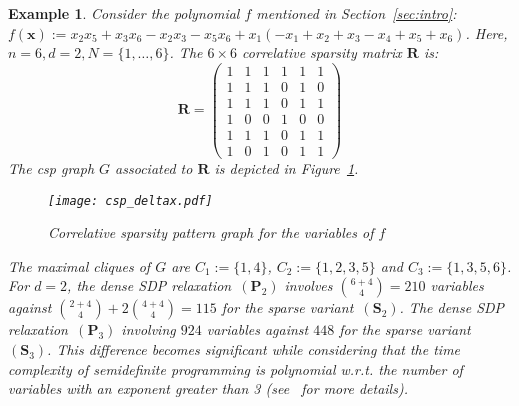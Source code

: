 \documentclass[preprint]{sigplanconf}
\newcommand{\x}{\mathbf{x}}
\def\P{\mathbf{P}}
\def\S{\mathbf{S}}
\def\S{\mathbf{S}}
\theoremstyle{plain}
\newtheorem{example}{Example}
\begin{document}
\begin{example}
\label{ex:sparse}
Consider the polynomial $f$ mentioned in Section~\ref{sec:intro}:
$f(\x) := x_2 x_5 + x_3 x_6 - x_2 x_3  - x_5 x_6 
+ x_1 ( - x_1 +  x_2 +  x_3  - x_4 +  x_5 +  x_6)$.
%
Here, $n = 6, d = 2, N = \{1,\dots, 6 \}$. The $6 \times 6$ correlative sparsity matrix $\mathbf{R}$ is:
\[
\mathbf{R} = 
\begin{pmatrix}
  1 & 1 & 1 & 1 & 1 & 1 \\
  1 & 1 & 1 & 0 & 1 & 0 \\
  1 & 1 & 1 & 0 & 1 & 1 \\
  1 & 0 & 0 & 1 & 0 & 0 \\
  1 & 1 & 1 & 0 & 1 & 1 \\
  1 & 0 & 1 & 0 & 1 & 1 
 \end{pmatrix}
\]
The csp graph $G$ associated to $\mathbf{R}$ is depicted in Figure~\ref{fig:csp_deltax}. 
%
\begin{figure}[!ht]	
\begin{center}
\texttt{[image: csp\_deltax.pdf]}
\caption{Correlative sparsity pattern graph for the variables of $f$}
\label{fig:csp_deltax}
\end{center}
\end{figure}
%
The maximal cliques of $G$ are $C_1 := \{1, 4\}$, $C_2 := \{1, 2, 3, 5\}$ and $C_3 := \{1, 3, 5, 6\}$. For $d=2$, the dense SDP relaxation~$(\P_2)$ involves $\binom{6 + 4}{4} = 210$ variables against $\binom{2 + 4}{4} + 2 \binom{4 + 4}{4} = 115$ for the sparse variant~$(\S_2)$. The dense SDP relaxation~$(\P_3)$ involving $924$ variables against $448$ for the sparse variant~$(\S_3)$. 
This difference becomes significant while considering that the time complexity of semidefinite programming is polynomial w.r.t. the number of variables with an exponent greater than 3 (see~\cite[Chapter 4]{BenTal01} for more details).
\end{example}
%
\end{document}
